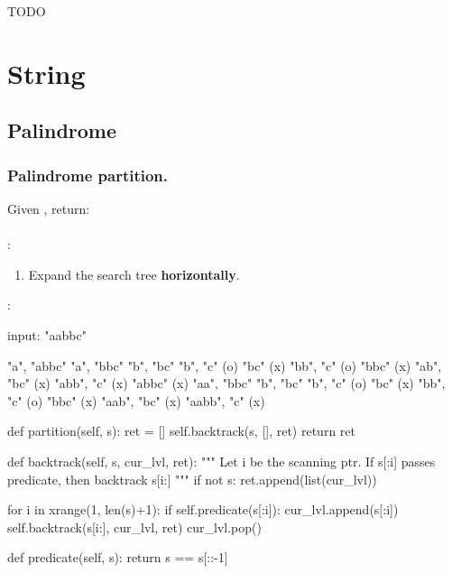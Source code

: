 TODO

\section{String}
\subsection{Palindrome}
\subsubsection{Palindrome partition.} Given , return: \\
\pyinline{[["aa","b"], ["a","a","b"]]}
\\
:
\begin{enumerate}
\item Expand the search tree \textbf{horizontally}.
\end{enumerate}
:
\begin{python}
input: "aabbc"

"a", "abbc"
     "a", "bbc"
          "b", "bc"
               "b", "c" (o)
               "bc" (x)
          "bb", "c" (o)
          "bbc" (x)
     "ab", "bc" (x)
     "abb", "c" (x)
     "abbc" (x)
"aa", "bbc"
      "b", "bc"
           "b", "c" (o)
           "bc" (x)
      "bb", "c" (o)
      "bbc" (x)
"aab", "bc" (x)
"aabb", "c" (x)
\end{python}
\begin{python}
def partition(self, s):
    ret = []
    self.backtrack(s, [], ret)
    return ret

def backtrack(self, s, cur_lvl, ret):
    """
    Let i be the scanning ptr.
    If s[:i] passes predicate, then backtrack s[i:]
    """
    if not s:
        ret.append(list(cur_lvl))

    for i in xrange(1, len(s)+1):
        if self.predicate(s[:i]):
            cur_lvl.append(s[:i])
            self.backtrack(s[i:], cur_lvl, ret)
            cur_lvl.pop()

def predicate(self, s):
    return s == s[::-1]
\end{python}
